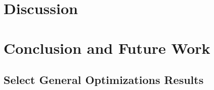 \documentclass[10pt]{article}
\begin{document}
\section{Discussion}


\section{Conclusion and Future Work}


\pagebreak




\pagebreak
\begin{appendices}

\section{Select General Optimizations Results}
\label{appendix:general-optimizations-results}
%

\end{appendices}
\end{document}
